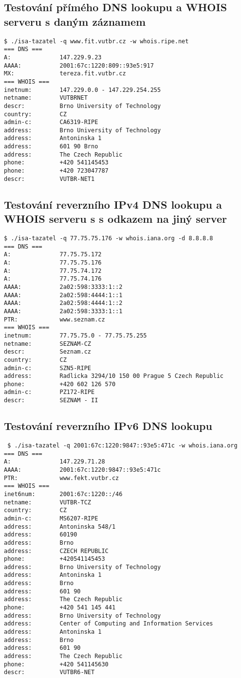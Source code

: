 \documentclass[a4paper, 11pt]{article}
\begin{document}
 \subsection{Testování přímého DNS lookupu a WHOIS serveru s daným záznamem}
\begin{lstlisting}
$ ./isa-tazatel -q www.fit.vutbr.cz -w whois.ripe.net
=== DNS ===
A:              147.229.9.23
AAAA:           2001:67c:1220:809::93e5:917
MX:             tereza.fit.vutbr.cz
=== WHOIS ===
inetnum:        147.229.0.0 - 147.229.254.255
netname:        VUTBRNET
descr:          Brno University of Technology
country:        CZ
admin-c:        CA6319-RIPE
address:        Brno University of Technology
address:        Antoninska 1
address:        601 90 Brno
address:        The Czech Republic
phone:          +420 541145453
phone:          +420 723047787
descr:          VUTBR-NET1

\end{lstlisting}
 \subsection{Testování reverzního IPv4 DNS lookupu a WHOIS serveru s s odkazem na jiný server}
\begin{lstlisting}
$ ./isa-tazatel -q 77.75.75.176 -w whois.iana.org -d 8.8.8.8
=== DNS ===
A:              77.75.75.172
A:              77.75.75.176
A:              77.75.74.172
A:              77.75.74.176
AAAA:           2a02:598:3333:1::2
AAAA:           2a02:598:4444:1::1
AAAA:           2a02:598:4444:1::2
AAAA:           2a02:598:3333:1::1
PTR:            www.seznam.cz
=== WHOIS ===
inetnum:        77.75.75.0 - 77.75.75.255
netname:        SEZNAM-CZ
descr:          Seznam.cz
country:        CZ
admin-c:        SZN5-RIPE
address:        Radlicka 3294/10 150 00 Prague 5 Czech Republic
phone:          +420 602 126 570
admin-c:        PZ172-RIPE
descr:          SEZNAM - II

\end{lstlisting}
 \subsection{Testování reverzního IPv6 DNS lookupu}
 \begin{lstlisting}
 $ ./isa-tazatel -q 2001:67c:1220:9847::93e5:471c -w whois.iana.org
=== DNS ===
A:              147.229.71.28
AAAA:           2001:67c:1220:9847::93e5:471c
PTR:            www.fekt.vutbr.cz
=== WHOIS ===
inet6num:       2001:67c:1220::/46
netname:        VUTBR-TCZ
country:        CZ
admin-c:        MS6207-RIPE
address:        Antoninska 548/1
address:        60190
address:        Brno
address:        CZECH REPUBLIC
phone:          +420541145453
address:        Brno University of Technology
address:        Antoninska 1
address:        Brno
address:        601 90
address:        The Czech Republic
phone:          +420 541 145 441
address:        Brno University of Technology
address:        Center of Computing and Information Services
address:        Antoninska 1
address:        Brno
address:        601 90
address:        The Czech Republic
phone:          +420 541145630
descr:          VUTBR6-NET
 
\end{lstlisting}
\end{document}
